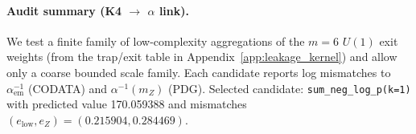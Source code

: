 \paragraph{Audit summary (K4 $\to$ $\alpha$ link).} \AuditTag We test a finite family of low-complexity aggregations of the $m=6$ $U(1)$ exit weights (from the trap/exit table in Appendix~\ref{app:leakage_kernel}) and allow only a coarse bounded scale family. Each candidate reports log mismatches to $\alpha_{\mathrm{em}}^{-1}$ (CODATA) and $\alpha^{-1}(m_Z)$ (PDG).
\noindent\AuditTag Selected candidate: \texttt{sum\_neg\_log\_p(k=1)} with predicted value 170.059388 and mismatches $(e_{\mathrm{low}},e_Z)=(0.215904,0.284469)$.